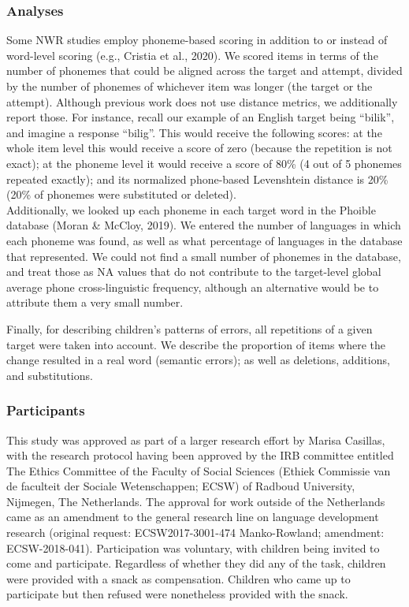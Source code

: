 \documentclass[english,,man,floatsintext]{apa6}
\begin{document}
\subsubsection{Analyses}\label{analyses}

Some NWR studies employ phoneme-based scoring in addition to or instead
of word-level scoring (e.g., Cristia et al., 2020). We scored items in
terms of the number of phonemes that could be aligned across the target
and attempt, divided by the number of phonemes of whichever item was
longer (the target or the attempt). Although previous work does not use
distance metrics, we additionally report those. For instance, recall our
example of an English target being ``bilik'', and imagine a response
``bilig''. This would receive the following scores: at the whole item
level this would receive a score of zero (because the repetition is not
exact); at the phoneme level it would receive a score of 80\% (4 out of
5 phonemes repeated exactly); and its normalized phone-based Levenshtein
distance is 20\% (20\% of phonemes were substituted or deleted).\\

Additionally, we looked up each phoneme in each target word in the
Phoible database (Moran \& McCloy, 2019). We entered the number of
languages in which each phoneme was found, as well as what percentage of
languages in the database that represented. We could not find a small
number of phonemes in the database, and treat those as NA values that do
not contribute to the target-level global average phone cross-linguistic
frequency, although an alternative would be to attribute them a very
small number.

Finally, for describing children's patterns of errors, all repetitions
of a given target were taken into account. We describe the proportion of
items where the change resulted in a real word (semantic errors); as
well as deletions, additions, and substitutions.

\subsubsection{Participants}\label{participants}

This study was approved as part of a larger research effort by Marisa
Casillas, with the research protocol having been approved by the IRB
committee entitled The Ethics Committee of the Faculty of Social
Sciences (Ethiek Commissie van de faculteit der Sociale Wetenschappen;
ECSW) of Radboud University, Nijmegen, The Netherlands. The approval for
work outside of the Netherlands came as an amendment to the general
research line on language development research (original request:
ECSW2017-3001-474 Manko-Rowland; amendment: ECSW-2018-041).
Participation was voluntary, with children being invited to come and
participate. Regardless of whether they did any of the task, children
were provided with a snack as compensation. Children who came up to
participate but then refused were nonetheless provided with the snack.
\end{document}
